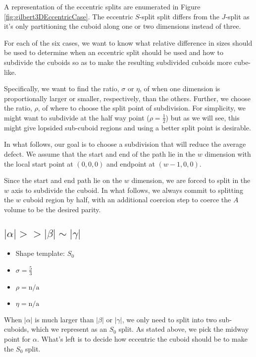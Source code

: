 A representation of the eccentric splits are enumerated in Figure \ref{fig:gilbert3DEccentricCase}.
The eccentric $S$-split split differs from the $J$-split as it's only partitioning the cuboid along
one or two dimensions instead of three.

For each of the six cases, we want to know what relative difference in sizes should be used
to determine when an eccentric split should be used and how to subdivide the cuboids so as to make
the resulting subdivided cuboids more cube-like.

Specifically, we want to find the ratio, $\sigma$ or $\eta$, of when one dimension is proportionally larger or smaller,
respectively, than the others.
Further, we choose the ratio, $\rho$, of where to choose the split point of subdivision.
For simplicity, we might want to subdivide at the half way point ($\rho = \frac{1}{2}$) but as we
will see, this might give lopsided sub-cuboid regions and using a better split point is desirable.

In what follows, our goal is to choose a subdivision that will reduce the average defect.
We assume that the start and end of the path lie in the $w$ dimension with the local start point at $(0,0,0)$
and endpoint at $(w-1,0,0)$.

Since the start and end path lie on the $w$ dimension, we are forced to split in the $w$ axis
to subdivide the cuboid.
In what follows, we always commit to splitting the $w$ cuboid region by half, with an
additional coercion step to coerce the $A$ volume to be the desired parity.

\subsection{$|\alpha| >> |\beta| \sim |\gamma|$}

\begin{itemize}
  \item Shape template: $S_0$
  \item $\sigma = \frac{5}{3}$
  \item $\rho = \text{n/a}$
  \item $\eta= \text{n/a}$
\end{itemize}


When $|\alpha|$ is much larger than $|\beta|$ or $|\gamma|$, we only need to split into two sub-cuboids,
which we represent as an $S_0$ split.
As stated above, we pick the midway point for $\alpha$.
What's left is to decide how eccentric the cuboid should be to make the $S_0$ split.

